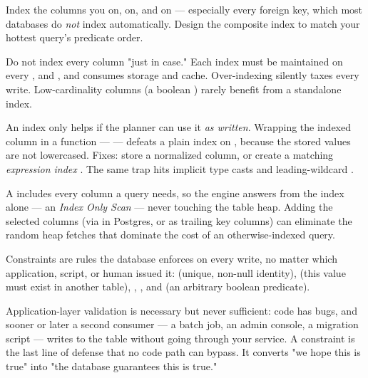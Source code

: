  Index the columns you  on,  on, and  on --- especially every foreign key, which most databases do \emph{not} index automatically. Design the composite index to match your hottest query's predicate order.

 Do not index every column "just in case." Each index must be maintained on every ,  and , and consumes storage and cache. Over-indexing silently taxes every write. Low-cardinality columns (a boolean ) rarely benefit from a standalone index.

\begin{dbinsight}
An index only helps if the planner can use it \emph{as written}. Wrapping the indexed column in a function ---  --- defeats a plain index on , because the stored values are not lowercased. Fixes: store a normalized column, or create a matching \emph{expression index} . The same trap hits implicit type casts and leading-wildcard .
\end{dbinsight}

\begin{perfnote}
A  includes every column a query needs, so the engine answers from the index alone --- an \emph{Index Only Scan} --- never touching the table heap. Adding the selected columns (via  in Postgres, or as trailing key columns) can eliminate the random heap fetches that dominate the cost of an otherwise-indexed query.
\end{perfnote}


 Constraints are rules the database enforces on every write, no matter which application, script, or human issued it:  (unique, non-null identity),  (this value must exist in another table), , , and  (an arbitrary boolean predicate).

 Application-layer validation is necessary but never sufficient: code has bugs, and sooner or later a second consumer --- a batch job, an admin console, a migration script --- writes to the table without going through your service. A constraint is the last line of defense that no code path can bypass. It converts "we hope this is true" into "the database guarantees this is true."

